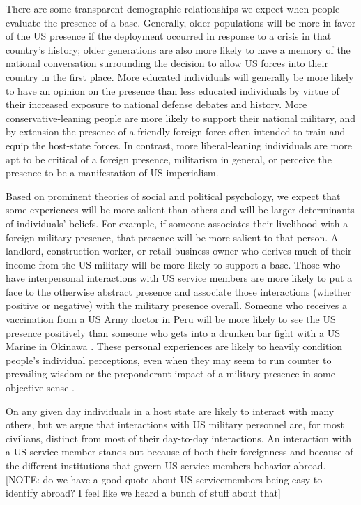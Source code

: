 {	There are some transparent demographic relationships we expect when people evaluate the presence of a base. Generally, older populations will be more in favor of the US presence if the deployment occurred in response to a crisis in that country's history; older generations are also more likely to have a memory of the national conversation surrounding the decision to allow US forces into their country in the first place. More educated individuals will generally be more likely to have an opinion on the presence than less educated individuals by virtue of their increased exposure to national defense debates and history. More conservative-leaning people are more likely to support their national military, and by extension the presence of a friendly foreign force often intended to train and equip the host-state forces. In contrast, more liberal-leaning individuals are more apt to be critical of a foreign presence, militarism in general, or perceive the presence to be a manifestation of US imperialism.
	
	Based on prominent theories of social and political psychology, we expect that some experiences will be more salient than others and will be larger determinants of individuals' beliefs. For example, if someone associates their livelihood with a foreign military presence, that presence will be more salient to that person. A landlord, construction worker, or retail business owner who derives much of their income from the US military will be more likely to support a base. Those who have interpersonal interactions with US service members are more likely to put a face to the otherwise abstract presence and associate those interactions (whether positive or negative) with the military presence overall\cite{Allen2020}. Someone who receives a vaccination from a US Army doctor in Peru will be more likely to see the US presence positively than someone who gets into a drunken bar fight with a US Marine in Okinawa \cite{Flynn2018}. These personal experiences are likely to heavily condition people's individual perceptions, even when they may seem to run counter to prevailing wisdom or the preponderant impact of a military presence in some objective sense \cite{Taber2006}.
	
On any given day individuals in a host state are likely to interact with many others, but we argue that interactions with US military personnel are, for most civilians, distinct from most of their day-to-day interactions. An interaction with a US service member stands out because of both their foreignness and because of the different institutions that govern US service members behavior abroad. [NOTE: do we have a good quote about US servicemembers being easy to identify abroad? I feel like we heard a bunch of stuff about that]
	
}
